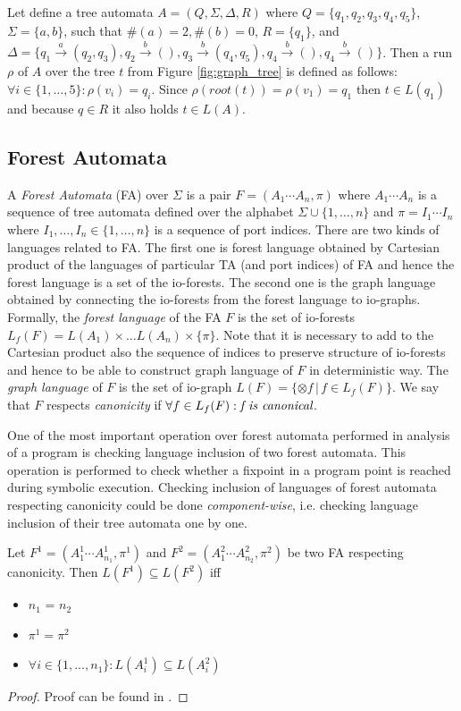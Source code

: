 \bexmp
Let define a tree automata $A=(Q,\Sigma,\Delta, R)$
where $Q=\{q_1,q_2,q_3,q_4,q_5\}$, $\Sigma = \{a,b\}$,
such that $\#(a) = 2, \#(b) =0$, $R=\{q_1\}$,
and $\Delta=\{q_1 \xrightarrow{a} (q_2,q_3), q_2 \xrightarrow{b} (),
q_3 \xrightarrow{b} (q_4,q_5), q_4 \xrightarrow{b} (), q_4 \xrightarrow{b} ()\}$.
Then a run $\rho$ of $A$ over the tree $t$ from Figure \ref{fig:graph_tree}
is defined as follows: $\forall i \in \{1,\ldots,5\}: \rho(v_i) = q_i$.
Since $\rho(root(t)) = \rho(v_1) = q_1$ then $t \in L(q_1)$ and because $q \in R$
it also holds $t \in L(A)$.
\label{ex:ta}
\eexmp

\subsection{Forest Automata}
\label{subsec:fa}

A \emph{Forest Automata} (FA) over $\Sigma$ is a pair $F=(A_1\cdots A_n, \pi)$
where $A_1 \cdots A_n$ is a sequence of tree automata defined over the alphabet $\Sigma \cup \{1,\ldots,n\}$
and $\pi = I_1 \cdots I_n$ where $I_1,\ldots, I_n \in \{1, \ldots, n\}$ is a sequence of port indices.
There are two kinds of languages related to FA.
The first one is forest language obtained by Cartesian product of the languages of particular TA (and port indices) of FA
and hence the forest language is a set of the io-forests.
The second one is the graph language obtained by connecting the io-forests from the forest language to io-graphs.
Formally, the \emph{forest language} of the FA $F$ is the set of io-forests $L_f(F)= L(A_1) \times \ldots L(A_n) \times \{\pi\}$.
Note that it is necessary to add to the Cartesian product also the sequence of indices to preserve structure of io-forests
and hence to be able to construct graph language of $F$ in deterministic way.
The \emph{graph language} of $F$ is the set of io-graph $L(F) = \{\otimes f\,|\, f \in L_f(F)\}$.
We say that $F$ respects \emph{canonicity} if $\forall f \in L_f(F): \emph{f is canonical}$.

One of the most important operation over forest automata performed in analysis of a program is checking
language inclusion of two forest automata.
This operation is performed to check whether a fixpoint in a program point is reached during symbolic execution.
Checking inclusion of languages of forest automata respecting canonicity could be done \emph{component-wise},
i.e. checking language inclusion of their tree automata one by one.

\begin{lemma}
	Let $F^1 = (A_1^1\cdots A_{n_{1}}^1, \pi^1)$ and $F^2 = (A_1^2\cdots A_{n_{2}}^2, \pi^2)$
	be two FA respecting canonicity.
	Then $L(F^1) \subseteq L(F^2)$ iff
	\begin{itemize}
			\item $n_1$ = $n_2$
			\item $\pi^1 = \pi^2$
			\item $\forall i \in \{1,\ldots,n_1\}: L(A_i^1) \subseteq L(A_i^2)$
	\end{itemize}
\end{lemma}
\begin{proof}
	Proof can be found in \cite{forester:techrep}.
\end{proof}

